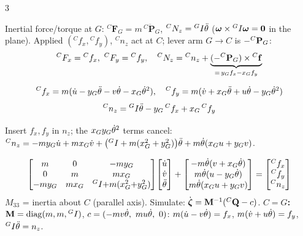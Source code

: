 \begin{multicols}{3}
\nopagebreak[4]
\begin{fbx}[Balance \pg{15--17}]
Inertial force/torque at $G$: ${}^C\mathbf F_G=m\,{}^C\ddot{\mathbf P}_G$, ${}^CN_z={}^{G}I\ddot\theta$ ($\boldsymbol\omega\times{}^{G}I\boldsymbol\omega=\mathbf 0$ in the plane). Applied $({}^Cf_x,{}^Cf_y)$, ${}^Cn_z$ act at $C$; lever arm $G\to C$ is $-{}^{C}\mathbf P_G$:
\[{}^CF_x={}^Cf_x,\ {}^CF_y={}^Cf_y,\quad{}^CN_z={}^Cn_z+\underbrace{(-\wEPG)\times{}^C\mathbf f}_{=\,y_Gf_x-x_Gf_y}\]
\end{fbx}
\begin{fbx}
\[{}^Cf_x=m(\dot u-y_G\ddot\theta-v\dot\theta-x_G\dot\theta^2),\quad{}^Cf_y=m(\dot v+x_G\ddot\theta+u\dot\theta-y_G\dot\theta^2)\]
\[{}^Cn_z={}^{G}I\ddot\theta-y_G\,{}^Cf_x+x_G\,{}^Cf_y\]
\end{fbx}
\begin{deriv}
Insert $f_x,f_y$ in $n_z$; the $x_Gy_G\dot\theta^2$ terms cancel: ${}^Cn_z=-my_G\dot u+mx_G\dot v+\big({}^{G}I+m(x_G^2+y_G^2)\big)\ddot\theta+m\dot\theta(x_Gu+y_Gv)$.
\end{deriv}
\begin{fbx}[Matrix form $\mathbf M\dot{\wEz}+c(\wEz)=\wEQC$ \pg{26}]
\[\begin{bmatrix}m&0&-my_G\\0&m&mx_G\\-my_G&mx_G&{}^{G}I{+}m(x_G^2{+}y_G^2)\end{bmatrix}\!\begin{bmatrix}\dot u\\\dot v\\\ddot\theta\end{bmatrix}+\begin{bmatrix}-m\dot\theta(v+x_G\dot\theta)\\m\dot\theta(u-y_G\dot\theta)\\m\dot\theta(x_Gu+y_Gv)\end{bmatrix}=\begin{bmatrix}{}^Cf_x\\{}^Cf_y\\{}^Cn_z\end{bmatrix}\]
$M_{33}$ = inertia about $C$ (parallel axis). Simulate: $\dot{\boldsymbol\zeta}=\mathbf M^{-1}({}^{C}\mathbf Q-c)$.
\textbf{$C=G$:} $\mathbf M=\operatorname{diag}(m,m,{}^{G}I)$, $c=(-mv\dot\theta,\ mu\dot\theta,\ 0)$: $m(\dot u-v\dot\theta)=f_x$, $m(\dot v+u\dot\theta)=f_y$, ${}^{G}I\ddot\theta=n_z$.
\end{fbx}
\begin{recipe}

\end{recipe}
\end{multicols}
